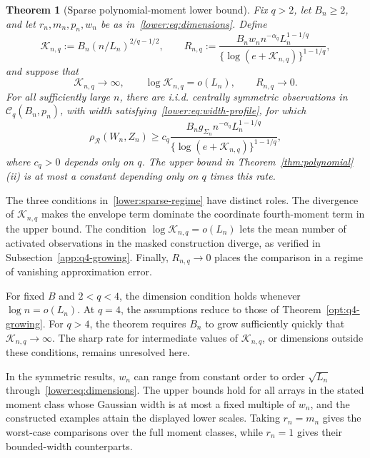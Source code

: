 \documentclass[11pt,letterpaper]{article}
\newtheorem{theorem}{Theorem}
\theoremstyle{remark}
\newcommand{\rh}{\rho_{\mathcal R}}
\begin{document}
\begin{theorem}[Sparse polynomial-moment lower bound]\label{lower:sparse}
Fix \(q>2\), let \(B_n\ge2\), and let
\(r_n,m_n,p_n,w_n\) be as in~\eqref{lower:eq:dimensions}.
Define
\[
 \mathcal K_{n,q}:=B_n(n/L_n)^{2/q-1/2},\qquad
 R_{n,q}:=\frac{B_n w_n n^{-\alpha_q}L_n^{1-1/q}}
 {\{\log(e+\mathcal K_{n,q})\}^{1-1/q}},
\]
and suppose that
\begin{equation}
 \mathcal K_{n,q}\to\infty,\qquad
 \log\mathcal K_{n,q}=o(L_n),\qquad R_{n,q}\to0.
 \label{lower:sparse-regime}
\end{equation}
For all sufficiently large \(n\), there are i.i.d. centrally symmetric
observations in \(\mathcal C_q(B_n,p_n)\), with width
satisfying~\eqref{lower:eq:width-profile}, for which
\begin{equation}
 \rh(W_n,Z_n)\ge c_q
 \frac{B_n g_{\Sigma_n}n^{-\alpha_q}L_n^{1-1/q}}
 {\{\log(e+\mathcal K_{n,q})\}^{1-1/q}},
 \label{lower:sparse-rate}
\end{equation}
where \(c_q>0\) depends only on \(q\). The upper bound in
Theorem~\ref{thm:polynomial}\textup{(ii)} is at most a constant
depending only on \(q\) times this rate.
\end{theorem}

The three conditions in~\eqref{lower:sparse-regime} have distinct
roles. The divergence of $\mathcal K_{n,q}$ makes the envelope
term dominate the coordinate fourth-moment term in the upper bound.
The condition $\log\mathcal K_{n,q}=o(L_n)$ lets the mean number
of activated observations in the masked construction diverge, as
verified in Subsection~\ref{app:q4-growing}. Finally, $R_{n,q}\to0$
places the comparison in a regime of vanishing approximation error.

For fixed $B$ and $2<q<4$, the dimension condition holds whenever
$\log n=o(L_n)$. At $q=4$, the assumptions reduce to those of
Theorem~\ref{opt:q4-growing}. For $q>4$, the theorem requires
$B_n$ to grow sufficiently quickly that $\mathcal K_{n,q}\to\infty$.
The sharp rate for intermediate values of $\mathcal K_{n,q}$,
or dimensions outside these conditions, remains unresolved here.

In the symmetric results, $w_n$ can range from constant order to
order $\sqrt{L_n}$ through~\eqref{lower:eq:dimensions}.
The upper bounds hold for all arrays in the stated moment class
whose Gaussian width is at most a fixed multiple of $w_n$, and
the constructed examples attain the displayed lower scales.
Taking $r_n=m_n$ gives the worst-case comparisons over the full
moment classes, while $r_n=1$ gives their bounded-width counterparts.
\end{document}
